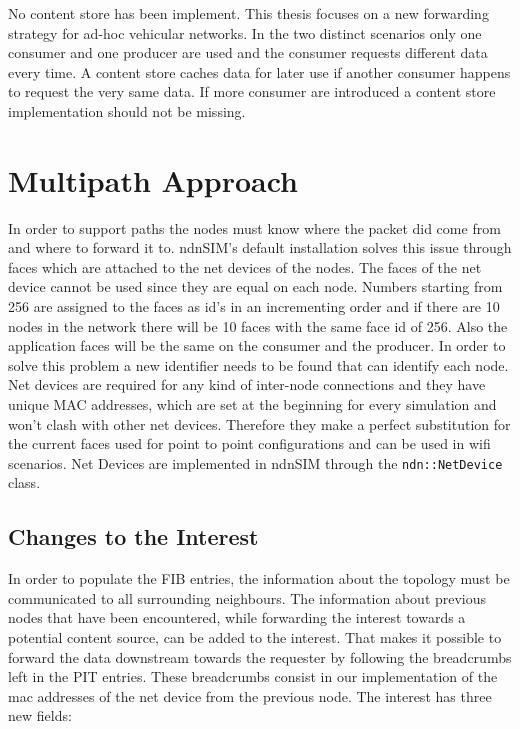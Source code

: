 No content store has been implement. This thesis focuses on a new forwarding strategy for ad-hoc vehicular networks. In the two distinct scenarios only one consumer and one producer are used and the consumer requests different data every time. A content store caches data for later use if another consumer happens to request the very same data. If more consumer are introduced a content store implementation should not be missing.


\section{Multipath Approach}

In order to support paths the nodes must know where the packet did come from and where to forward it to. ndnSIM's default installation solves this issue through faces which are attached to the net devices of the nodes. The faces of the net device cannot be used since they are equal on each node. Numbers starting from 256 are assigned to the faces as id's in an incrementing order and if there are 10 nodes in the network there will be 10 faces with the same face id of 256. Also the application faces will be the same on the consumer and the producer. In order to solve this problem a new identifier needs to be found that can identify each node. Net devices are required for any kind of inter-node connections and they have unique MAC addresses, which are set at the beginning for every simulation and won't clash with other net devices. Therefore they make a perfect substitution for the current faces used for point to point configurations and can be used in wifi scenarios. Net Devices are implemented in ndnSIM through the \texttt{ndn::NetDevice} class.

\subsection{Changes to the Interest}

In order to populate the FIB entries, the information about the topology must be communicated to all surrounding neighbours. The information about previous nodes that have been encountered, while forwarding the interest towards a potential content source, can be added to the interest. That makes it possible to forward the data downstream towards the requester by following the breadcrumbs left in the PIT entries. These breadcrumbs consist in our implementation of the mac addresses of the net device from the previous node. The interest has three new fields:

